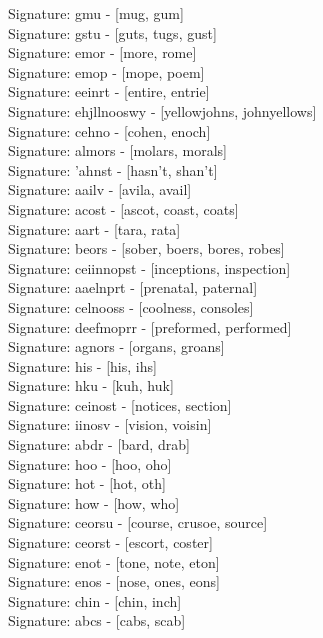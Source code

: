 Signature: {gmu} - [mug, gum] \\
Signature: {gstu} - [guts, tugs, gust] \\
Signature: {emor} - [more, rome] \\
Signature: {emop} - [mope, poem] \\
Signature: {eeinrt} - [entire, entrie] \\
Signature: {ehjllnooswy} - [yellowjohns, johnyellows] \\
Signature: {cehno} - [cohen, enoch] \\
Signature: {almors} - [molars, morals] \\
Signature: {'ahnst} - [hasn't, shan't] \\
Signature: {aailv} - [avila, avail] \\
Signature: {acost} - [ascot, coast, coats] \\
Signature: {aart} - [tara, rata] \\
Signature: {beors} - [sober, boers, bores, robes] \\
Signature: {ceiinnopst} - [inceptions, inspection] \\
Signature: {aaelnprt} - [prenatal, paternal] \\
Signature: {celnooss} - [coolness, consoles] \\
Signature: {deefmoprr} - [preformed, performed] \\
Signature: {agnors} - [organs, groans] \\
Signature: {his} - [his, ihs] \\
Signature: {hku} - [kuh, huk] \\
Signature: {ceinost} - [notices, section] \\
Signature: {iinosv} - [vision, voisin] \\
Signature: {abdr} - [bard, drab] \\
Signature: {hoo} - [hoo, oho] \\
Signature: {hot} - [hot, oth] \\
Signature: {how} - [how, who] \\
Signature: {ceorsu} - [course, crusoe, source] \\
Signature: {ceorst} - [escort, coster] \\
Signature: {enot} - [tone, note, eton] \\
Signature: {enos} - [nose, ones, eons] \\
Signature: {chin} - [chin, inch] \\
Signature: {abcs} - [cabs, scab] \\
